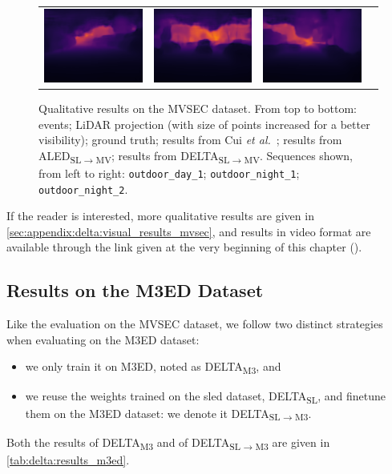 \begin{figure}
\begin{tabular}{@{}cccc@{}}
    \includegraphics[width=0.31\linewidth]{mainmatter/figures/5_depth_transf/mvsec_cmp/delta/predbf002965.png} &
    \includegraphics[width=0.31\linewidth]{mainmatter/figures/5_depth_transf/mvsec_cmp/delta/predbf007350.png} &
    \includegraphics[width=0.31\linewidth]{mainmatter/figures/5_depth_transf/mvsec_cmp/delta/predbf013112.png}
  \end{tabular}
  \cprotect\caption{Qualitative results on the MVSEC dataset. From top to bottom: events; LiDAR projection (with size of points increased for a better visibility); ground truth; results from Cui \textit{et al.}~\cite{Cui2022DenseDE}; results from ALED\textsubscript{SL\(\rightarrow\)MV}; results from DELTA\textsubscript{SL\(\rightarrow\)MV}. Sequences shown, from left to right: \verb|outdoor_day_1|; \verb|outdoor_night_1|; \verb|outdoor_night_2|.}\label{fig:delta:cmp_mvsec}
\end{figure}

If the reader is interested, more qualitative results are given in \cref{sec:appendix:delta:visual_results_mvsec}, and results in video format are available through the link given at the very beginning of this chapter ().

\subsection{Results on the M3ED Dataset}
Like the evaluation on the MVSEC dataset, we follow two distinct strategies when evaluating on the M3ED dataset:
\begin{itemize}
  \item we only train it on M3ED, noted as DELTA\textsubscript{M3}, and
  \item we reuse the weights trained on the \acrshort{sled} dataset, DELTA\textsubscript{SL}, and finetune them on the M3ED dataset: we denote it DELTA\textsubscript{SL\(\rightarrow\)M3}.
\end{itemize}
Both the results of DELTA\textsubscript{M3} and of DELTA\textsubscript{SL\(\rightarrow\)M3} are given in \cref{tab:delta:results_m3ed}.

